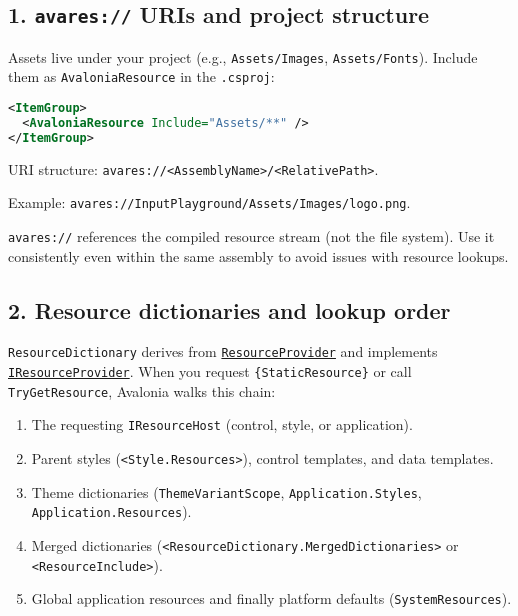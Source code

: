 \subsection{\texorpdfstring{1. \texttt{avares://} URIs and project
structure}{1. avares:// URIs and project structure}}\label{avares-uris-and-project-structure}

Assets live under your project (e.g.,
\passthrough{\lstinline!Assets/Images!},
\passthrough{\lstinline!Assets/Fonts!}). Include them as
\passthrough{\lstinline!AvaloniaResource!} in the
\passthrough{\lstinline!.csproj!}:

\begin{lstlisting}[language=XML]
<ItemGroup>
  <AvaloniaResource Include="Assets/**" />
</ItemGroup>
\end{lstlisting}

URI structure:
\passthrough{\lstinline!avares://<AssemblyName>/<RelativePath>!}.

Example:
\passthrough{\lstinline!avares://InputPlayground/Assets/Images/logo.png!}.

\passthrough{\lstinline!avares://!} references the compiled resource
stream (not the file system). Use it consistently even within the same
assembly to avoid issues with resource lookups.

\subsection{2. Resource dictionaries and lookup
order}\label{resource-dictionaries-and-lookup-order}

\passthrough{\lstinline!ResourceDictionary!} derives from
\href{https://github.com/AvaloniaUI/Avalonia/blob/master/src/Avalonia.Base/Controls/ResourceProvider.cs}{\passthrough{\lstinline!ResourceProvider!}}
and implements
\href{https://github.com/AvaloniaUI/Avalonia/blob/master/src/Avalonia.Base/Controls/IResourceProvider.cs}{\passthrough{\lstinline!IResourceProvider!}}.
When you request \passthrough{\lstinline!\{StaticResource\}!} or call
\passthrough{\lstinline!TryGetResource!}, Avalonia walks this chain:

\begin{enumerate}
\def\labelenumi{\arabic{enumi}.}
\tightlist
\item
  The requesting \passthrough{\lstinline!IResourceHost!} (control,
  style, or application).
\item
  Parent styles (\passthrough{\lstinline!<Style.Resources>!}), control
  templates, and data templates.
\item
  Theme dictionaries (\passthrough{\lstinline!ThemeVariantScope!},
  \passthrough{\lstinline!Application.Styles!},
  \passthrough{\lstinline!Application.Resources!}).
\item
  Merged dictionaries
  (\passthrough{\lstinline!<ResourceDictionary.MergedDictionaries>!} or
  \passthrough{\lstinline!<ResourceInclude>!}).
\item
  Global application resources and finally platform defaults
  (\passthrough{\lstinline!SystemResources!}).
\end{enumerate}

